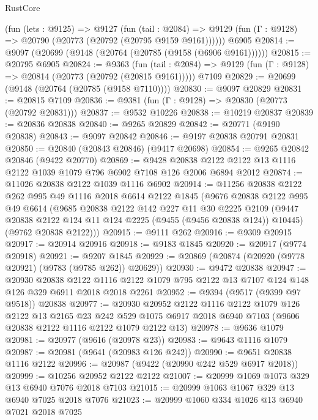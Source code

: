 \begin{lexlean}{RustCore}
\begin{coremodule}
    (fun (lets : @9125) =>
    @9127
      (fun (tail : @2084) =>
      @9129 (fun (Γ : @9128) => @20790 (@20773 (@20792 (@20795 @9159 @9161))))))
    @6905
@20814 := @9097 (@20699 (@9148 (@20764 (@20785 (@9158 (@6906 @9161))))))
@20815 := @20795 @6905
@20824 := @9363
    (fun (tail : @2084) => @9129 (fun (Γ : @9128) => @20814 (@20773 (@20792 (@20815 @9161)))))
    @7109
@20829 := @20699 (@9148 (@20764 (@20785 (@9158 @7110))))
@20830 := @9097 @20829
@20831 := @20815 @7109
@20836 := @9381 (fun (Γ : @9128) => @20830 (@20773 (@20792 @20831)))
@20837 := @9532 @10226
@20838 := @10219 @20837
@20839 := @20836 @20838
@20840 := @9265 @20829
@20842 := @20771 (@9190 @20838)
@20843 := @9097 @20842
@20846 := @9197 @20838 @20791 @20831
@20850 := @20840 (@20843 @20846) (@9417 @20698)
@20854 := @9265 @20842 @20846 (@9422 @20770)
@20869 := @9428
    @20838
    @2122
    @2122
    @13
    @1116
    @2122
    @1039
    @1079
    @796
    @6902
    @7108
    @126
    @2006
    @6894
    @2012
@20874 := @11026 @20838 @2122 @1039 @1116 @6902
@20914 := @11256
    @20838
    @2122
    @262
    @995
    @49
    @1116
    @2018
    @6614
    @2122
    @1845
    (@9676
      @20838
      @2122
      @995
      @49
      @6614
      (@9685
        @20838
        @2122
        @142
        @227
        @11
        @30
        @2225
        @2109
        (@9447 @20838 @2122 @124 @11 @124 @2225 (@9455 (@9456 @20838 @124)) @10445)
        (@9762 @20838 @2122)))
@20915 := @9111 @262
@20916 := @9309 @20915
@20917 := @20914 @20916
@20918 := @9183 @1845
@20920 := @20917 (@9774 @20918)
@20921 := @9207 @1845
@20929 := @20869 (@20874 (@20920 (@9778 @20921) (@9783 (@9785 @262)) @20629))
@20930 := @9472 @20838
@20947 := @20930
    @20838
    @2122
    @1116
    @2122
    @1079
    @795
    @2122
    @13
    @7107
    @124
    @148
    @126
    @329
    @6911
    @2018
    @2018
    @2261
@20952 := @9394 (@9517 (@9399 @97 @9518)) @20838
@20977 := @20930
    @20952
    @2122
    @1116
    @2122
    @1079
    @126
    @2122
    @13
    @2165
    @23
    @242
    @529
    @1075
    @6917
    @2018
    @6940
    @7103
    (@9606 @20838 @2122 @1116 @2122 @1079 @2122 @13)
@20978 := @9636 @1079
@20981 := @20977 (@9616 (@20978 @23))
@20983 := @9643 @1116 @1079
@20987 := @20981 (@9641 (@20983 @126 @242))
@20990 := @9651 @20838 @1116 @2122
@20996 := @20987 (@9422 (@20990 @242 @529 @6917 @2018))
@20999 := @10256 @20952 @2122 @2122
@21007 := @20999 @1069 @1073 @329 @13 @6940 @7076 @2018 @7103
@21015 := @20999 @1063 @1067 @329 @13 @6940 @7025 @2018 @7076
@21023 := @20999 @1060 @334 @1026 @13 @6940 @7021 @2018 @7025

\end{coremodule}
\end{lexlean}
